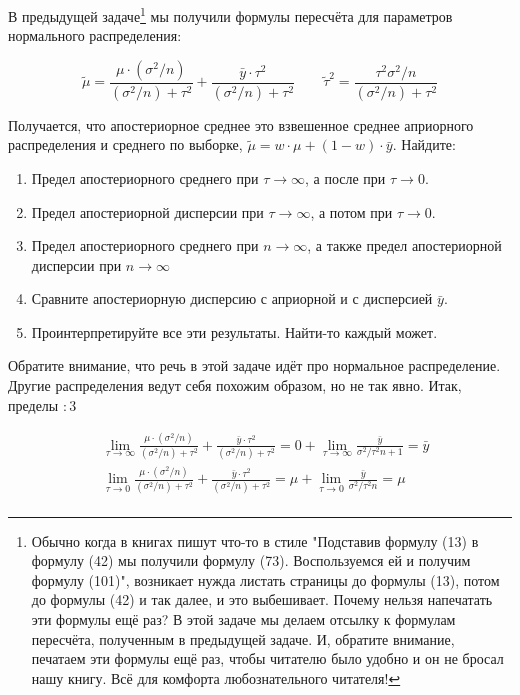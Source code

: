 \begin{problem}\label{upr_predel}
В предыдущей задаче\footnote{Обычно когда в книгах пишут что-то в стиле "Подставив формулу (13) в формулу (42) мы получили формулу (73). Воспользуемся ей и получим формулу (101)",  возникает нужда листать страницы до формулы (13), потом до формулы (42) и так далее, и это выбешивает. Почему нельзя напечатать эти формулы ещё раз? В этой задаче мы делаем отсылку к формулам пересчёта, полученным в предыдущей задаче. И, обратите внимание, печатаем эти формулы ещё раз, чтобы читателю было удобно и он не бросал нашу книгу. Всё для комфорта любознательного читателя!}  мы получили формулы пересчёта для параметров нормального распределения:

\[ \tilde \mu = \frac{\mu \cdot (\sigma^2/n)}{(\sigma^2/n) + \tau^2} + \frac{\bar y \cdot \tau^2}{(\sigma^2/n) + \tau^2}  \qquad \tilde \tau^2 = \frac{\tau^2 \sigma^2/n}{(\sigma^2/n) + \tau^2} \]

Получается, что апостериорное среднее это взвешенное среднее априорного распределения  и среднего по выборке, $\tilde \mu = w \cdot \mu + (1 - w) \cdot \bar{y}$. Найдите:

\begin{enumerate}
\item Предел апостериорного среднего при $\tau \to \infty$, а после при $\tau \to 0$. 
\item Предел апостериорной дисперсии при $\tau \to \infty$, а потом  при $\tau \to 0$.
\item Предел апостериорного среднего при $n \to \infty$, а также предел апостериорной дисперсии при $n \to \infty$
\item Сравните апостериорную дисперсию с априорной и с дисперсией $\bar y$.
\item Проинтерпретируйте все эти результаты. Найти-то каждый может.
\end{enumerate}

\begin{sol}
Обратите внимание, что речь в этой задаче идёт про нормальное распределение. Другие распределения ведут себя похожим образом, но не так явно. Итак, пределы $:3$

\begin{align*}
&\lim_{\tau \to \infty} \frac{\mu \cdot (\sigma^2/n)}{(\sigma^2/n) + \tau^2} + \frac{\bar y \cdot \tau^2}{(\sigma^2/n) + \tau^2} = 0 + \lim_{\tau \to \infty} \frac{\bar y}{\sigma^2/\tau^2 n + 1} = \bar y \\
&\lim_{\tau \to 0} \frac{\mu \cdot (\sigma^2/n)}{(\sigma^2/n) + \tau^2} + \frac{\bar y \cdot \tau^2}{(\sigma^2/n) + \tau^2} = \mu + \lim_{\tau \to 0} \frac{\bar y}{\sigma^2/\tau^2 n} = \mu  \\
\end{align*}


\end{sol}
\end{problem}
